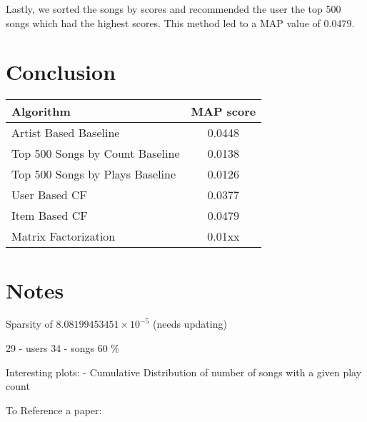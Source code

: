\documentclass[12pt,preprint]{aastex}
\begin{document}
Lastly, we sorted the songs by scores and recommended the user the top 500 songs which had the highest scores. This method led to a MAP value of 0.0479.





\section{Conclusion}

\begin{table}[h]
\begin{center}
\begin{tabular}{lc}

\hline
\bf{Algorithm} &  \bf{MAP score}\\ \hline
Artist Based  Baseline  & 0.0448    \\ 
Top 500 Songs by Count  Baseline &  0.0138  \\ 
Top 500 Songs by Plays  Baseline &  0.0126  \\ 
User Based  CF  &  0.0377 \\ 
Item Based  CF  &  0.0479 \\ 
Matrix Factorization  &   0.01xx  \\ 
\end{tabular}
\end{center}
\end{table}


\section{Notes}
Sparsity of $8.08199453451\times 10^{-5}$ (needs updating)



29 - users
34 - songs 
60 \%

Interesting plots:
- Cumulative Distribution of number of songs with a given play count

To Reference a paper: 
\end{document}
